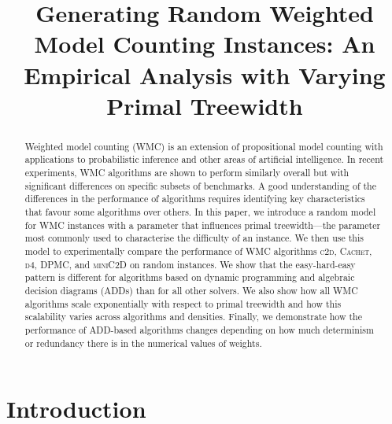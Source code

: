 \documentclass[letterpaper]{article} %
\title{Generating Random Weighted Model Counting Instances: An Empirical
  Analysis with Varying Primal Treewidth}
\theoremstyle{definition}
\theoremstyle{remark}
\begin{document}
\maketitle

\begin{abstract}
  Weighted model counting (\textsf{WMC}) is an extension of propositional model
  counting with applications to probabilistic inference and other areas of
  artificial intelligence. In recent experiments, \textsf{WMC} algorithms are
  shown to perform similarly overall but with significant differences on
  specific subsets of benchmarks. A good understanding of the differences in the
  performance of algorithms requires identifying key characteristics that favour
  some algorithms over others. In this paper, we introduce a random model for
  \textsf{WMC} instances with a parameter that influences primal treewidth---the
  parameter most commonly used to characterise the difficulty of an instance. We
  then use this model to experimentally compare the performance of \textsf{WMC}
  algorithms \textsc{c2d}, \textsc{Cachet}, \textsc{d4}, \textsc{DPMC}, and
  \textsc{miniC2D} on random instances. We show that the easy-hard-easy pattern
  is different for algorithms based on dynamic programming and algebraic
  decision diagrams (ADDs) than for all other solvers. We also show how all
  \textsf{WMC} algorithms scale exponentially with respect to primal treewidth
  and how this scalability varies across algorithms and densities. Finally, we
  demonstrate how the performance of ADD-based algorithms changes depending on
  how much determinism or redundancy there is in the numerical values of
  weights.
\end{abstract}

\section{Introduction}
\end{document}
